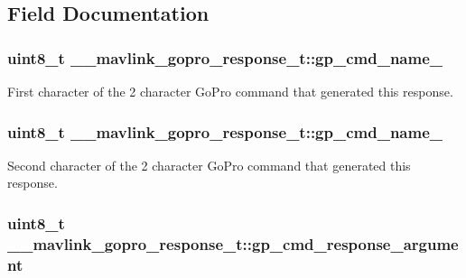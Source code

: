 \subsection{Field Documentation}
\hypertarget{struct____mavlink__gopro__response__t_a8eee7760ec224e994b9477be6ff7a6ea}{
\subsubsection[{gp\+\_\+cmd\+\_\+name\+\_\+1}]{\setlength{\rightskip}{0pt plus 5cm}uint8\+\_\+t \+\_\+\+\_\+mavlink\+\_\+gopro\+\_\+response\+\_\+t\+::gp\+\_\+cmd\+\_\+name\+\_}}\label{struct____mavlink__gopro__response__t_a8eee7760ec224e994b9477be6ff7a6ea}


First character of the 2 character Go\+Pro command that generated this response. 

\hypertarget{struct____mavlink__gopro__response__t_a60fbdf0f68123962d08816514f08dfe3}{
\subsubsection[{gp\+\_\+cmd\+\_\+name\+\_\+2}]{\setlength{\rightskip}{0pt plus 5cm}uint8\+\_\+t \+\_\+\+\_\+mavlink\+\_\+gopro\+\_\+response\+\_\+t\+::gp\+\_\+cmd\+\_\+name\+\_}}\label{struct____mavlink__gopro__response__t_a60fbdf0f68123962d08816514f08dfe3}


Second character of the 2 character Go\+Pro command that generated this response. 

\hypertarget{struct____mavlink__gopro__response__t_a4a16ec02c717a3e3b0039bb36aefafe4}{
\subsubsection[{gp\+\_\+cmd\+\_\+response\+\_\+argument}]{\setlength{\rightskip}{0pt plus 5cm}uint8\+\_\+t \+\_\+\+\_\+mavlink\+\_\+gopro\+\_\+response\+\_\+t\+::gp\+\_\+cmd\+\_\+response\+\_\+argument}}\label{struct____mavlink__gopro__response__t_a4a16ec02c717a3e3b0039bb36aefafe4}


